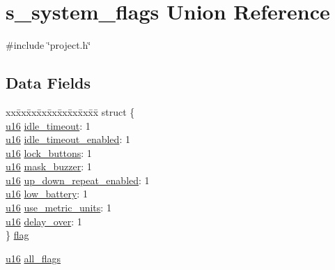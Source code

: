 \hypertarget{unions__system__flags}{\section{s\-\_\-system\-\_\-flags \-Union \-Reference}
\label{unions__system__flags}
}


{\ttfamily \#include \char`\"{}project.\-h\char`\"{}}

\subsection*{\-Data \-Fields}
\begin{DoxyCompactItemize}
\item 
\begin{tabbing}
xx\=xx\=xx\=xx\=xx\=xx\=xx\=xx\=xx\=\kill
struct \{\\
\>\hyperlink{main__ED__BM_8c_a9e6c91d77e24643b888dbd1a1a590054}{u16} \hyperlink{unions__system__flags_a819736792984a6a50bc4ffb12a07b985}{idle\_timeout}: 1\\
\>\hyperlink{main__ED__BM_8c_a9e6c91d77e24643b888dbd1a1a590054}{u16} \hyperlink{unions__system__flags_a4eb0bedb9c098be48631490b698bd4c2}{idle\_timeout\_enabled}: 1\\
\>\hyperlink{main__ED__BM_8c_a9e6c91d77e24643b888dbd1a1a590054}{u16} \hyperlink{unions__system__flags_acd9be7d7d1ed9ec42ab8f98441ff45d4}{lock\_buttons}: 1\\
\>\hyperlink{main__ED__BM_8c_a9e6c91d77e24643b888dbd1a1a590054}{u16} \hyperlink{unions__system__flags_a765f5b6a5660c70f770d6bbeec25cf1f}{mask\_buzzer}: 1\\
\>\hyperlink{main__ED__BM_8c_a9e6c91d77e24643b888dbd1a1a590054}{u16} \hyperlink{unions__system__flags_a47613fdc4c935cabe322cb63cac9150d}{up\_down\_repeat\_enabled}: 1\\
\>\hyperlink{main__ED__BM_8c_a9e6c91d77e24643b888dbd1a1a590054}{u16} \hyperlink{unions__system__flags_aa8d3cce6cd6787288b722314ba457797}{low\_battery}: 1\\
\>\hyperlink{main__ED__BM_8c_a9e6c91d77e24643b888dbd1a1a590054}{u16} \hyperlink{unions__system__flags_a98d55100d4348e9980fe36505551b5d8}{use\_metric\_units}: 1\\
\>\hyperlink{main__ED__BM_8c_a9e6c91d77e24643b888dbd1a1a590054}{u16} \hyperlink{unions__system__flags_ad5b983b8993f0c84c55acdf27ba1b970}{delay\_over}: 1\\
\} \hyperlink{unions__system__flags_af304308f8c7e41fd32adb2085357b6ae}{flag}\\

\end{tabbing}\item 
\hyperlink{main__ED__BM_8c_a9e6c91d77e24643b888dbd1a1a590054}{u16} \hyperlink{unions__system__flags_abf876e68df8575f02084e137cc49266b}{all\-\_\-flags}
\end{DoxyCompactItemize}


